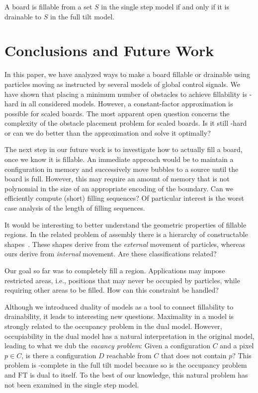 \documentclass[a4paper,UKenglish,cleveref,thm-restate]{lipics-v2021}
\newcommand{\FT}{\ensuremath{\mathrm{FT}}\xspace}
\begin{document}
\begin{corollary}\label{cor:s1-fill}
A board is fillable from a set $S$ in the single step model if and only if it is
drainable to $S$ in the full tilt model.
\end{corollary}
     \section{Conclusions and Future Work}\label{sec:conclusion}

In this paper, we have analyzed ways to make a board fillable or drainable using
particles moving as instructed by several models of global control signals. We
have shown that placing a minimum number of obstacles to
achieve fillability is \NP-hard in all considered models. However, a constant-factor approximation is
possible for scaled boards. The most apparent open question concerns the
complexity of the obstacle placement problem for scaled boards. Is it still
\NP-hard or can we do better than the approximation and solve it optimally?

The next step in our future work is to investigate how to actually fill a board,
once we know it is fillable. An immediate approach would be to maintain a
configuration in memory and successively move bubbles to a source until the board
is full. However, this may require an amount of memory that is not polynomial
in the size of an appropriate encoding of the boundary.
Can we efficiently compute (short) filling sequences? Of particular
interest is the worst case analysis of the length of filling sequences.

It would be interesting to better understand the geometric properties
of fillable regions. In the related problem of assembly there is a hierarchy of
constructable shapes~\cite{hierarchical2020}. These shapes derive from the
\emph{external} movement of particles, whereas ours derive from \emph{internal}
movement. Are these classifications related?

Our goal so far was to completely fill a region. Applications may
impose restricted areas, i.e., positions that may never be occupied by
particles, while requiring other areas to be filled. How can this constraint be
handled?

Although we introduced duality of models as a tool to connect fillability to
drainability, it leads to interesting new questions. Maximality in a model is
strongly related to the occupancy problem in the dual model. However,
occupiability in the dual model has a natural interpretation in the original
model, leading to what we dub the \emph{vacancy problem}: Given a configuration
$C$ and a pixel $p \in C$, is there a configuration $D$ reachable from $C$
that does not contain $p$?  This problem is \PSPACE-complete in the full tilt
model because so is the occupancy problem and \FT is dual to itself. To the best
of our knowledge, this natural problem has not been examined in the single step
model.
\end{document}
